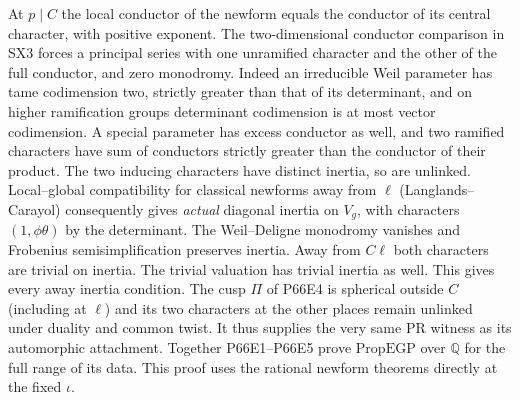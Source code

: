 At $p\mid C$ the local conductor of the newform equals the
conductor of its central character, with positive exponent.
The two-dimensional conductor comparison in SX3 forces a principal
series with one unramified character and the other of the full
conductor, and zero monodromy. Indeed an irreducible Weil parameter
has tame codimension two, strictly greater than that of its
determinant, and on higher ramification groups determinant
codimension is at most vector codimension. A special parameter
has excess conductor as well, and two ramified characters have
sum of conductors strictly greater than the conductor of their
product. The two inducing characters have distinct inertia, so
are unlinked. Local--global compatibility for classical newforms
away from $\ell$ (Langlands--Carayol) consequently gives
\emph{actual} diagonal inertia on $V_g$, with characters
$(1,\phi\theta)$ by the determinant. The Weil--Deligne
monodromy vanishes and Frobenius semisimplification preserves
inertia. Away from $C\ell$ both characters are trivial on
inertia. The trivial valuation has trivial inertia as well.
This gives every away inertia condition. The cusp $\Pi$ of P66E4
is spherical outside $C$ (including at $\ell$) and its two
characters at the other places remain unlinked under duality
and common twist. It thus supplies the very same $\mathrm{PR}$
witness as its automorphic attachment. Together P66E1--P66E5
prove $\mathrm{PropEGP}$ over $\mathbb Q$ for the full range
of its data. This proof uses the rational newform theorems
directly at the fixed $\iota$.

